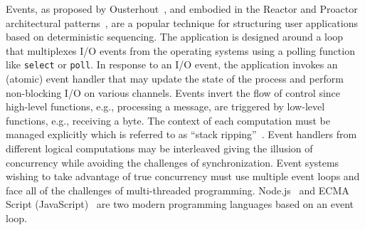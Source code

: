 
Events, as proposed by Ousterhout~\cite{ousterhout1996threads}, and embodied in the Reactor and Proactor architectural patterns~\cite{schmidt2000pattern}, are a popular technique for structuring user applications based on deterministic sequencing.
The application is designed around a loop that multiplexes I/O events from the operating systems using a polling function like \verb+select+ or \verb+poll+.
In response to an I/O event, the application invokes an (atomic) event handler that may update the state of the process and perform non-blocking I/O on various channels.
Events invert the flow of control since high-level functions, e.g., processing a message, are triggered by low-level functions, e.g., receiving a byte.
The context of each computation must be managed explicitly which is referred to as ``stack ripping''~\cite{adya2002cooperative}.
Event handlers from different logical computations may be interleaved giving the illusion of concurrency while avoiding the challenges of synchronization.
Event systems wishing to take advantage of true concurrency must use multiple event loops and face all of the challenges of multi-threaded programming.
Node.js~\cite{Surhone:2010:NOD:1941165} and ECMA Script (JavaScript)~\cite{EcmaScript} are two modern programming languages based on an event loop.


